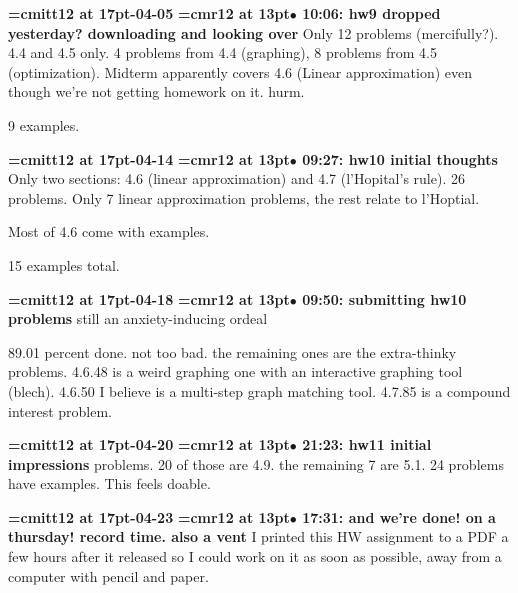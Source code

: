 {\medskip\noindent\bf\font\titlefont=cmitt12 at 17pt-04-05}\medskip
{\smallskip\noindent\bf\font\titlefont=cmr12 at 13pt\titlefont $\bullet$ 10:06: hw9 dropped yesterday? downloading and looking over}\smallskip
Only 12 problems (mercifully?). 4.4 and 4.5 only. 4 problems from 4.4 (graphing), 8 problems from 4.5 (optimization). Midterm apparently covers 4.6 (Linear approximation) even though we're not getting homework on it. hurm.
\par

9 examples.
\par

{\medskip\noindent\bf\font\titlefont=cmitt12 at 17pt-04-14}\medskip
{\smallskip\noindent\bf\font\titlefont=cmr12 at 13pt\titlefont $\bullet$ 09:27: hw10 initial thoughts}\smallskip
Only two sections: 4.6 (linear approximation) and 4.7 (l'Hopital's rule). 26 problems. Only 7 linear approximation problems, the rest relate to l'Hoptial.
\par

Most of 4.6 come with examples.
\par

15 examples total.
\par

{\medskip\noindent\bf\font\titlefont=cmitt12 at 17pt-04-18}\medskip
{\smallskip\noindent\bf\font\titlefont=cmr12 at 13pt\titlefont $\bullet$ 09:50: submitting hw10 problems}\smallskip
still an anxiety-inducing ordeal
\par

89.01 percent done. not too bad. the remaining ones are the extra-thinky problems. 4.6.48 is a weird graphing one with an interactive graphing tool (blech). 4.6.50 I believe is a multi-step graph matching tool. 4.7.85 is a compound interest problem.
\par

{\medskip\noindent\bf\font\titlefont=cmitt12 at 17pt-04-20}\medskip
{\smallskip\noindent\bf\font\titlefont=cmr12 at 13pt\titlefont $\bullet$ 21:23: hw11 initial impressions} problems. 20 of those are 4.9. the remaining 7 are 5.1. 24 problems have examples. This feels doable.
\par

{\medskip\noindent\bf\font\titlefont=cmitt12 at 17pt-04-23}\medskip
{\smallskip\noindent\bf\font\titlefont=cmr12 at 13pt\titlefont $\bullet$ 17:31: and we're done! on a thursday! record time. also a vent}\smallskip
I printed this HW assignment to a PDF a few hours after it released so I could work on it as soon as possible, away from a computer with pencil and paper.
\par

